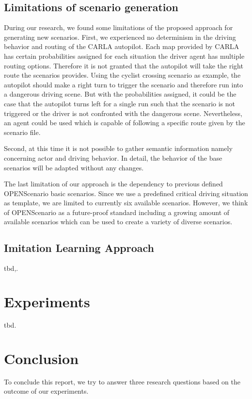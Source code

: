 \documentclass[conference, 11pt]{IEEEtran}
\begin{document}
\subsection{Limitations of scenario generation}
During our research, we found some limitations of the proposed approach for generating new scenarios. First, we experienced no determinism in the driving behavior and routing of the CARLA autopilot. Each map provided by CARLA has certain probabilities assigned for each situation the driver agent has multiple routing options. Therefore it is not granted that the autopilot will take the right route the scenarios provides. Using the cyclist crossing scenario as example, the autopilot should make a right turn to trigger the scenario and therefore run into a dangerous driving scene. But with the probabilities assigned, it could be the case that the autopilot turns left for a single run such that the scenario is not triggered or the driver is not confronted with the dangerous scene. Nevertheless, an agent could be used which is capable of following a specific route given by the scenario file.

Second, at this time it is not possible to gather semantic information namely concerning actor and driving behavior. In detail, the behavior of the base scenarios will be adapted without any changes.  

The last limitation of our approach is the dependency to previous defined OPENScenario basic scenarios. Since we use a predefined critical driving situation as template, we are limited to currently six available scenarios. However, we think of OPENScenario as a future-proof standard including a growing amount of available scenarios which can be used to create a variety of diverse scenarios.

\subsection{Imitation Learning Approach}
tbd,.

\section{Experiments}
tbd. 



\section{Conclusion}
To conclude this report, we try to answer three research questions based on the outcome of our experiments.
\end{document}
